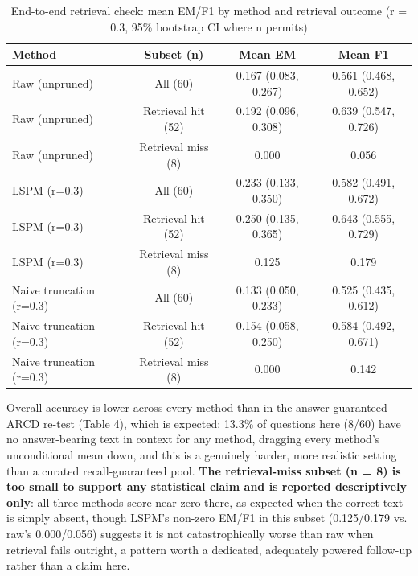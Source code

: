 \begin{table}[htbp]
\caption{End-to-end retrieval check: mean EM/F1 by method and retrieval outcome (r = 0.3, 95\% bootstrap CI where n permits)}
\label{tab:8}
\centering
\footnotesize
\setlength{\tabcolsep}{3.5pt}
\begin{tabular}{lccc}
\toprule
Method & Subset (n) & Mean EM & Mean F1 \\
\midrule
Raw (unpruned) & All (60) & 0.167 (0.083, 0.267) & 0.561 (0.468, 0.652) \\
Raw (unpruned) & Retrieval hit (52) & 0.192 (0.096, 0.308) & 0.639 (0.547, 0.726) \\
Raw (unpruned) & Retrieval miss (8) & 0.000 & 0.056 \\
LSPM (r=0.3) & All (60) & 0.233 (0.133, 0.350) & 0.582 (0.491, 0.672) \\
LSPM (r=0.3) & Retrieval hit (52) & 0.250 (0.135, 0.365) & 0.643 (0.555, 0.729) \\
LSPM (r=0.3) & Retrieval miss (8) & 0.125 & 0.179 \\
Naive truncation (r=0.3) & All (60) & 0.133 (0.050, 0.233) & 0.525 (0.435, 0.612) \\
Naive truncation (r=0.3) & Retrieval hit (52) & 0.154 (0.058, 0.250) & 0.584 (0.492, 0.671) \\
Naive truncation (r=0.3) & Retrieval miss (8) & 0.000 & 0.142 \\
\bottomrule
\end{tabular}
\end{table}
Overall accuracy is lower across every method than in the answer-guaranteed ARCD re-test (Table 4), which is expected: 13.3\% of questions here (8/60) have no answer-bearing text in context for any method, dragging every method's unconditional mean down, and this is a genuinely harder, more realistic setting than a curated recall-guaranteed pool. \textbf{The retrieval-miss subset (n = 8) is too small to support any statistical claim and is reported descriptively only}: all three methods score near zero there, as expected when the correct text is simply absent, though LSPM's non-zero EM/F1 in this subset (0.125/0.179 vs. raw's 0.000/0.056) suggests it is not catastrophically worse than raw when retrieval fails outright, a pattern worth a dedicated, adequately powered follow-up rather than a claim here.

